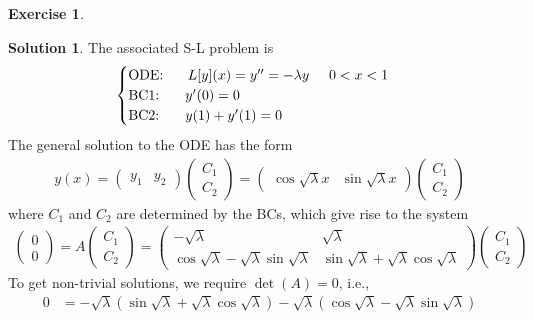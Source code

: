 \documentclass{article}
\theoremstyle{definition}
\newtheorem*{exer*}{Exercise}
\newtheorem*{sln*}{Solution}
\newcommand{\C}{\mathbb{C}}
\begin{document}
\begin{exer*}
\begin{enumerate}
\begin{sln*}
			The associated S-L problem is
			\begin{align*}
			\begin{cases}
			\text{ODE: }\hspace{0.5cm} L[y](x) = y'' = -\lambda y\hspace{0.5cm} 0<x<1\\
			\text{BC1: }\hspace{0.5cm} y'(0) = 0\\
			\text{BC2: }\hspace{0.5cm} y(1) + y'(1) = 0
			\end{cases}
			\end{align*}
			The general solution to the ODE has the form
			\begin{align*}
			y(x) = \begin{pmatrix}
			y_1 & y_2
			\end{pmatrix}
			\begin{pmatrix}
			C_1\\C_2
			\end{pmatrix} = 
			\begin{pmatrix}
			\cos\sqrt{\lambda} x & \sin\sqrt{\lambda} x
			\end{pmatrix}
			\begin{pmatrix}
			C_1\\C_2
			\end{pmatrix}
			\end{align*}
			where $C_1$ and $C_2$ are determined by the BCs, which give rise to the system
			\begin{align*}
			\begin{pmatrix}
			0\\0
			\end{pmatrix} = A\begin{pmatrix}
			C_1\\C_2
			\end{pmatrix} = \begin{pmatrix}
			-\sqrt{\lambda} &  \sqrt{\lambda}  \\  \cos\sqrt{\lambda} - \sqrt{\lambda}\sin\sqrt{\lambda}  & \sin\sqrt{\lambda} + \sqrt{\lambda}\cos\sqrt{\lambda}
			\end{pmatrix}
			\begin{pmatrix}
			C_1\\C_2
			\end{pmatrix}
			\end{align*}
			To get non-trivial solutions, we require $\det(A) = 0$, i.e., 
			\begin{align*}
			0 &= -\sqrt{\lambda}(\sin\sqrt{\lambda} + \sqrt{\lambda}\cos\sqrt{\lambda} ) - \sqrt{\lambda}(\cos\sqrt{\lambda} - \sqrt{\lambda}\sin\sqrt{\lambda})\\

\end{align*}
\end{sln*}
\end{enumerate}
\end{exer*}
\end{document}
